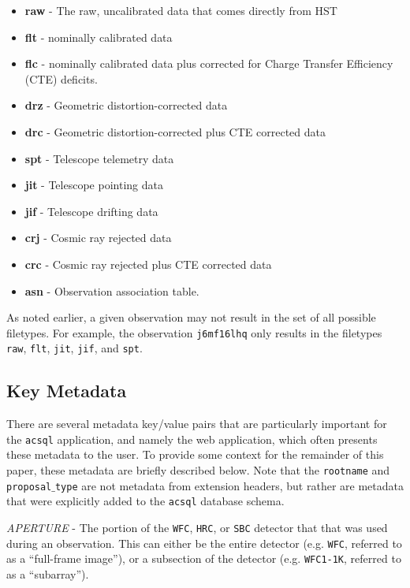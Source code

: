 \documentclass[10pt,journal,compsoc]{IEEEtran}
\begin{document}
\begin{itemize}
  \item \textbf{raw} - The raw, uncalibrated data that comes directly from HST
  \item \textbf{flt} - nominally calibrated data
  \item \textbf{flc} - nominally calibrated data plus corrected for Charge Transfer Efficiency (CTE) deficits.
  \item \textbf{drz} - Geometric distortion-corrected data
  \item \textbf{drc} - Geometric distortion-corrected plus CTE corrected data
  \item \textbf{spt} - Telescope telemetry data
  \item \textbf{jit} - Telescope pointing data
  \item \textbf{jif} - Telescope drifting data
  \item \textbf{crj} - Cosmic ray rejected data
  \item \textbf{crc} - Cosmic ray rejected plus CTE corrected data
  \item \textbf{asn} - Observation association table.
\end{itemize}

As noted earlier, a given observation may not result in the set of all possible filetypes. For example, the observation \texttt{j6mf16lhq} only results in the
filetypes \texttt{raw}, \texttt{flt}, \texttt{jit}, \texttt{jif}, and \texttt{spt}.


\subsection{Key Metadata} \label{sec1.2}

There are several metadata key/value pairs that are particularly important for the \texttt{acsql} application, and namely the web application, which often
presents these metadata to the user.  To provide some context for the remainder of this paper, these metadata are briefly described below.  Note that the
\texttt{rootname} and \texttt{proposal$\_$type} are not metadata from extension headers, but rather are metadata that were explicitly added to the
\texttt{acsql} database schema.\newline

\textit{APERTURE} - The portion of the \texttt{WFC}, \texttt{HRC}, or \texttt{SBC} detector that that was used during an observation.  This can either be the
entire detector (e.g. \texttt{WFC}, referred to as a ``full-frame image''), or a subsection of the detector (e.g. \texttt{WFC1-1K}, referred to as a ``subarray'').\\
\end{document}
